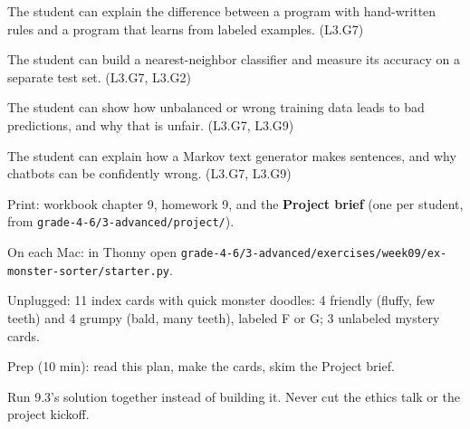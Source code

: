 
\begin{objectives}
  \item The student can explain the difference between a program with hand-written rules and a program that learns from labeled examples. (L3.G7)
  \item The student can build a nearest-neighbor classifier and measure its accuracy on a separate test set. (L3.G7, L3.G2)
  \item The student can show how unbalanced or wrong training data leads to bad predictions, and why that is unfair. (L3.G7, L3.G9)
  \item The student can explain how a Markov text generator makes sentences, and why chatbots can be confidently wrong. (L3.G7, L3.G9)
\end{objectives}

\begin{materials}
  \item Print: workbook chapter 9, homework 9, and the \textbf{Project brief} (one per student, from \texttt{grade-4-6/3-advanced/project/}).
  \item On each Mac: in Thonny open \texttt{grade-4-6/3-advanced/exercises/week09/ex-monster-sorter/starter.py}.
  \item Unplugged: 11 index cards with quick monster doodles: 4 friendly (fluffy, few teeth) and 4 grumpy (bald, many teeth), labeled F or G; 3 unlabeled mystery cards.
  \item Prep (10 min): read this plan, make the cards, skim the Project brief.
\end{materials}

\begin{timeplan}
\end{timeplan}
\begin{teachernote}
Run 9.3's solution together instead of building it. Never cut the ethics talk or the project kickoff.
\end{teachernote}

